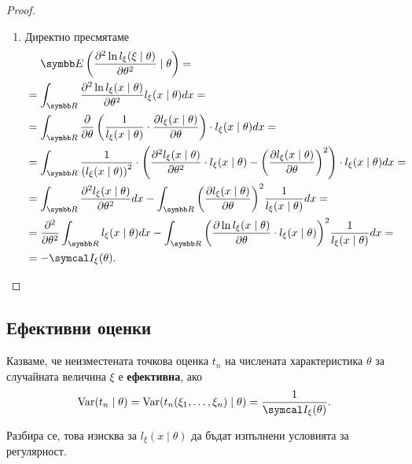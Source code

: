 \documentclass[numbers=endperiod, bibliography=totocnumbered]{scrartcl}
\begin{document}
\begin{proof}
\begin{enumerate}
    \item Директно пресмятаме
    \begin{align*}
      &~~~~\Expect\left( \frac {\partial^2 \ln l_\xi(\xi \mid \theta)} {\partial \theta^2} \mid \theta \right)
      = \\ &=
      \int_{\R} \frac {\partial^2 \ln l_\xi(x \mid \theta)} {\partial \theta^2} l_\xi(x \mid \theta) dx
      = \\ &=
      \int_{\R} \frac \partial {\partial \theta} \left(\frac 1 {l_\xi(x \mid \theta)} \cdot \frac {\partial l_\xi(x \mid \theta)} {\partial \theta} \right) \cdot l_\xi(x \mid \theta) dx
      = \\ &=
      \int_{\R} \frac 1 {{(l_\xi(x \mid \theta))}^2} \cdot \left( \frac {\partial^2 l_\xi(x \mid \theta)} {\partial \theta^2} \cdot l_\xi(x \mid \theta) - {\left(\frac {\partial l_\xi(x \mid \theta)} {\partial \theta} \right)}^2 \right) \cdot l_\xi(x \mid \theta) dx
      = \\ &=
      \int_{\R} \frac {\partial^2 l_\xi(x \mid \theta)} {\partial \theta^2} dx - \int_{\R} {\left(\frac {\partial l_\xi(x \mid \theta)} {\partial \theta} \right)}^2 \frac 1 {l_\xi(x \mid \theta)} dx
      = \\ &=
      \frac {\partial^2} {\partial \theta^2} \int_{\R} l_\xi(x \mid \theta) dx - \int_{\R} {\left(\frac {\partial \ln l_\xi(x \mid \theta)} {\partial \theta} \cdot l_\xi(x \mid \theta) \right)}^2 \frac 1 {l_\xi(x \mid \theta)} dx
      = \\ &=
      -\FisherInfo_\xi(\theta).
    \end{align*}
  \end{enumerate}
\end{proof}

\subsection{Ефективни оценки}

\begin{definition}
  Казваме, че неизместената точкова оценка \( t_n \) на числената характеристика \( \theta \) за случайната величина \( \xi \) е \textbf{ефективна}, ако
  \begin{equation*}
    \Var(t_n \mid \theta) = \Var(t_n(\xi_1, \ldots, \xi_n) \mid \theta) = \frac 1 {\FisherInfo_\xi(\theta)}.
  \end{equation*}

  Разбира се, това изисква за \( l_\xi(x \mid \theta) \) да бъдат изпълнени условията за регулярност.
\end{definition}
\end{document}
